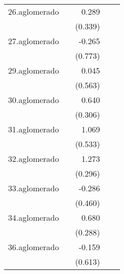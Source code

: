 {\begin{longtable}{l*{4}{D{.}{.}{-1}}}
\addlinespace
26.aglomerado&                     &       0.289         &                     &                     \\
            &                     &     (0.339)         &                     &                     \\
\addlinespace
27.aglomerado&                     &      -0.265         &                     &                     \\
            &                     &     (0.773)         &                     &                     \\
\addlinespace
29.aglomerado&                     &       0.045         &                     &                     \\
            &                     &     (0.563)         &                     &                     \\
\addlinespace
30.aglomerado&                     &       0.640\sym{*}  &                     &                     \\
            &                     &     (0.306)         &                     &                     \\
\addlinespace
31.aglomerado&                     &       1.069\sym{*}  &                     &                     \\
            &                     &     (0.533)         &                     &                     \\
\addlinespace
32.aglomerado&                     &       1.273\sym{***}&                     &                     \\
            &                     &     (0.296)         &                     &                     \\
\addlinespace
33.aglomerado&                     &      -0.286         &                     &                     \\
            &                     &     (0.460)         &                     &                     \\
\addlinespace
34.aglomerado&                     &       0.680\sym{*}  &                     &                     \\
            &                     &     (0.288)         &                     &                     \\
\addlinespace
36.aglomerado&                     &      -0.159         &                     &                     \\
            &                     &     (0.613)         &                     &                     \\

\end{longtable}}
